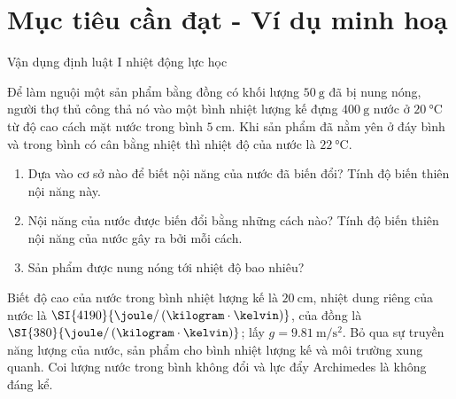 \section{Mục tiêu cần đạt - Ví dụ minh hoạ}
\begin{dang}{Vận dụng định luật I nhiệt động lực học}
	{Để làm nguội một sản phẩm bằng đồng có khối lượng $\SI{50}{\gram}$ đã bị nung nóng, người thợ thủ công thả nó vào một bình nhiệt lượng kế đựng $\SI{400}{\gram}$ nước ở $\SI{20}{\celsius}$ từ độ cao cách mặt nước trong bình $\SI{5}{\centi\meter}$. Khi sản phẩm đã nằm yên ở đáy bình và trong bình có cân bằng nhiệt thì nhiệt độ của nước là $\SI{22}{\celsius}$.
		\begin{enumerate}[label=\alph*)]
			\item Dựa vào cơ sở nào để biết nội năng của nước đã biến đổi? Tính độ biến thiên nội năng này.
			\item Nội năng của nước được biến đổi bằng những cách nào? Tính độ biến thiên nội năng của nước gây ra bởi mỗi cách.
			\item Sản phẩm được nung nóng tới nhiệt độ bao nhiêu?
		\end{enumerate}
	Biết độ cao của nước trong bình nhiệt lượng kế là $\SI{20}{\centi\meter}$, nhiệt dung riêng của nước là $\SI{4190}{\joule/\left(\kilogram\cdot\kelvin\right)}$, của đồng là $\SI{380}{\joule/\left(\kilogram\cdot\kelvin\right)}$; lấy $g=\SI{9.81}{\meter/\second^2}$. Bỏ qua sự truyền năng lượng của nước, sản phẩm cho bình nhiệt lượng kế và môi trường xung quanh. Coi lượng nước trong bình không đổi và lực đẩy Archimedes là không đáng kể.
}
{}
\end{dang}
